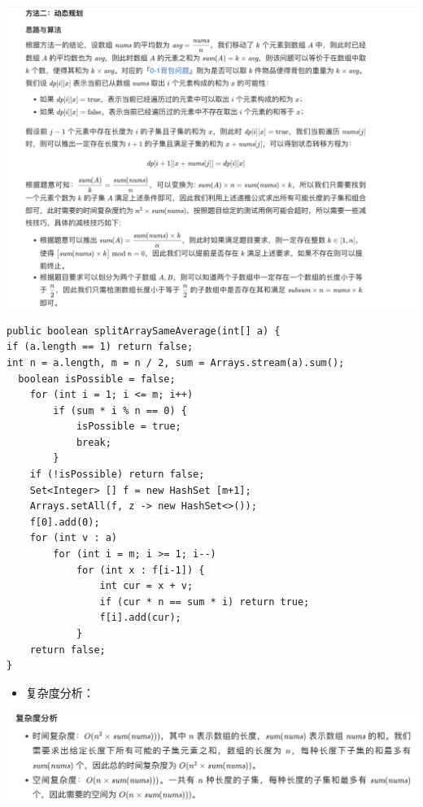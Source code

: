 \documentclass[9pt, b5paaper]{book}
\begin{document}
\begin{enumerate}
\includegraphics[width=.9\linewidth]{./pic/dp_20230414_202732.png}
\begin{verbatim}
public boolean splitArraySameAverage(int[] a) {
if (a.length == 1) return false;
int n = a.length, m = n / 2, sum = Arrays.stream(a).sum();
  boolean isPossible = false;
    for (int i = 1; i <= m; i++)
        if (sum * i % n == 0) {
            isPossible = true;
            break;
        }
    if (!isPossible) return false;
    Set<Integer> [] f = new HashSet [m+1];
    Arrays.setAll(f, z -> new HashSet<>());
    f[0].add(0);
    for (int v : a) 
        for (int i = m; i >= 1; i--) 
            for (int x : f[i-1]) {
                int cur = x + v;
                if (cur * n == sum * i) return true;
                f[i].add(cur);
            }
    return false;
}
\end{verbatim}
\begin{itemize}
\item 复杂度分析：
\end{itemize}

\includegraphics[width=.9\linewidth]{./pic/dp_20230414_202518.png}
\end{enumerate}
\end{document}
